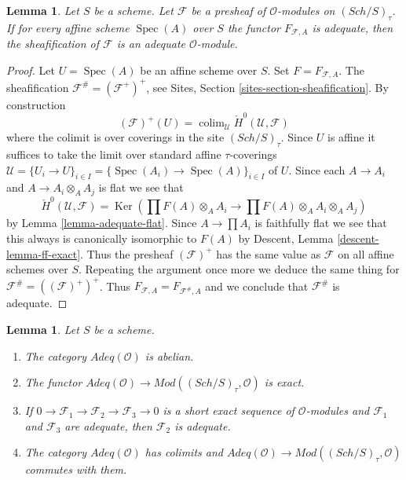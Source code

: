 \documentclass{stacks-project}
\theoremstyle{plain}
\newtheorem{lemma}[subsection]{Lemma}
\theoremstyle{definition}
\theoremstyle{remark}
\numberwithin{equation}{subsection}
\def\colim{\mathop{\mathrm{colim}}\nolimits}
\def\Spec{\mathop{\mathrm{Spec}}}
\def\Sch{\mathit{Sch}}
\def\Ker{\mathop{\mathrm{Ker}}}
\begin{document}
\begin{lemma}
\label{lemma-sheafification-adequate}
Let $S$ be a scheme. Let $\mathcal{F}$ be a presheaf of $\mathcal{O}$-modules
on $(\Sch/S)_\tau$. If for every affine scheme
$\Spec(A)$ over $S$ the functor $F_{\mathcal{F}, A}$ is
adequate, then the sheafification of $\mathcal{F}$ is an adequate
$\mathcal{O}$-module.
\end{lemma}

\begin{proof}
Let $U = \Spec(A)$ be an affine scheme over $S$.
Set $F = F_{\mathcal{F}, A}$.
The sheafification $\mathcal{F}^\# = (\mathcal{F}^+)^+$, see
Sites, Section \ref{sites-section-sheafification}.
By construction
$$
(\mathcal{F})^+(U) =
\colim_\mathcal{U} \check{H}^0(\mathcal{U}, \mathcal{F})
$$
where the colimit is over coverings in the site $(\Sch/S)_\tau$.
Since $U$ is affine it suffices to take the limit over standard
affine $\tau$-coverings
$\mathcal{U} = \{U_i \to U\}_{i \in I} =
\{\Spec(A_i) \to \Spec(A)\}_{i \in I}$ of $U$.
Since each $A \to A_i$ and $A \to A_i \otimes_A A_j$ is flat we see that
$$
\check{H}^0(\mathcal{U}, \mathcal{F}) =
\Ker(\prod F(A) \otimes_A A_i \to \prod F(A) \otimes_A A_i \otimes_A A_j)
$$
by
Lemma \ref{lemma-adequate-flat}.
Since $A \to \prod A_i$ is faithfully flat we see that this always
is canonically isomorphic to $F(A)$ by
Descent, Lemma \ref{descent-lemma-ff-exact}.
Thus the presheaf $(\mathcal{F})^+$ has the same value as
$\mathcal{F}$ on all affine schemes over $S$. Repeating the argument
once more we deduce the same thing for $\mathcal{F}^\# = ((\mathcal{F})^+)^+$.
Thus $F_{\mathcal{F}, A} = F_{\mathcal{F}^\#, A}$ and we conclude
that $\mathcal{F}^\#$ is adequate.
\end{proof}

\begin{lemma}
\label{lemma-abelian-adequate}
Let $S$ be a scheme.
\begin{enumerate}
\item The category $\textit{Adeq}(\mathcal{O})$ is abelian.
\item The functor
$\textit{Adeq}(\mathcal{O}) \to
\textit{Mod}((\Sch/S)_\tau, \mathcal{O})$
is exact.
\item If $0 \to \mathcal{F}_1 \to \mathcal{F}_2 \to \mathcal{F}_3 \to 0$
is a short exact sequence of $\mathcal{O}$-modules and
$\mathcal{F}_1$ and $\mathcal{F}_3$ are adequate, then
$\mathcal{F}_2$ is adequate.
\item The category $\textit{Adeq}(\mathcal{O})$ has colimits and
$\textit{Adeq}(\mathcal{O}) \to
\textit{Mod}((\Sch/S)_\tau, \mathcal{O})$
commutes with them.
\end{enumerate}
\end{lemma}
\end{document}
